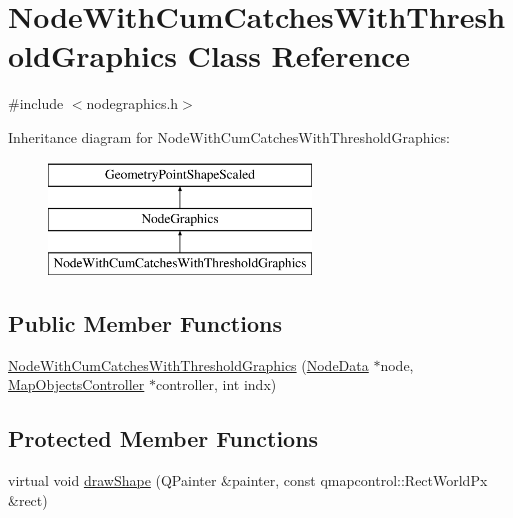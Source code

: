 \hypertarget{class_node_with_cum_catches_with_threshold_graphics}{}\section{Node\+With\+Cum\+Catches\+With\+Threshold\+Graphics Class Reference}
\label{class_node_with_cum_catches_with_threshold_graphics}


{\ttfamily \#include $<$nodegraphics.\+h$>$}

Inheritance diagram for Node\+With\+Cum\+Catches\+With\+Threshold\+Graphics\+:\begin{figure}[H]
\begin{center}
\leavevmode
\includegraphics[height=3.000000cm]{d4/d84/class_node_with_cum_catches_with_threshold_graphics}
\end{center}
\end{figure}
\subsection*{Public Member Functions}
\begin{DoxyCompactItemize}
\item 
\mbox{\hyperlink{class_node_with_cum_catches_with_threshold_graphics_a62472da1883ace05a692b318ba7c65db}{Node\+With\+Cum\+Catches\+With\+Threshold\+Graphics}} (\mbox{\hyperlink{class_node_data}{Node\+Data}} $\ast$node, \mbox{\hyperlink{class_map_objects_controller}{Map\+Objects\+Controller}} $\ast$controller, int indx)
\end{DoxyCompactItemize}
\subsection*{Protected Member Functions}
\begin{DoxyCompactItemize}
\item 
virtual void \mbox{\hyperlink{class_node_with_cum_catches_with_threshold_graphics_a7e406d033babbf0f01e1ecdec054da66}{draw\+Shape}} (Q\+Painter \&painter, const qmapcontrol\+::\+Rect\+World\+Px \&rect)
\end{DoxyCompactItemize}
